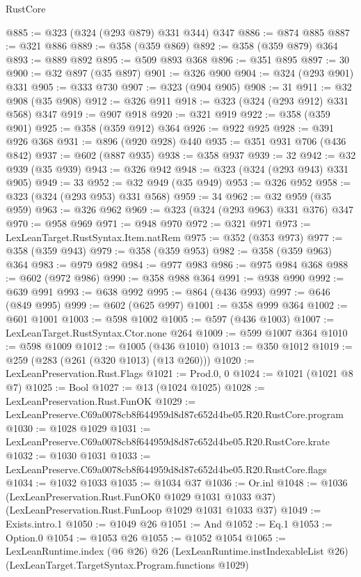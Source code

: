 \begin{lexlean}{RustCore}
\begin{coremodule}
@885 := @323 (@324 (@293 @879) @331 @344) @347
@886 := @874 @885
@887 := @321 @886
@889 := @358 (@359 @869)
@892 := @358 (@359 @879) @364
@893 := @889 @892
@895 := @509 @893 @368
@896 := @351 @895
@897 := 30
@900 := @32 @897 (@35 @897)
@901 := @326 @900
@904 := @324 (@293 @901) @331
@905 := @333 @730
@907 := @323 (@904 @905)
@908 := 31
@911 := @32 @908 (@35 @908)
@912 := @326 @911
@918 := @323 (@324 (@293 @912) @331 @568) @347
@919 := @907 @918
@920 := @321 @919
@922 := @358 (@359 @901)
@925 := @358 (@359 @912) @364
@926 := @922 @925
@928 := @391 @926 @368
@931 := @896 (@920 @928) @440
@935 := @351 @931 @706 (@436 @842)
@937 := @602 (@887 @935)
@938 := @358 @937
@939 := 32
@942 := @32 @939 (@35 @939)
@943 := @326 @942
@948 := @323 (@324 (@293 @943) @331 @905)
@949 := 33
@952 := @32 @949 (@35 @949)
@953 := @326 @952
@958 := @323 (@324 (@293 @953) @331 @568)
@959 := 34
@962 := @32 @959 (@35 @959)
@963 := @326 @962
@969 := @323 (@324 (@293 @963) @331 @376) @347
@970 := @958 @969
@971 := @948 @970
@972 := @321 @971
@973 := LexLeanTarget.RustSyntax.Item.natRem
@975 := @352 (@353 @973)
@977 := @358 (@359 @943)
@979 := @358 (@359 @953)
@982 := @358 (@359 @963) @364
@983 := @979 @982
@984 := @977 @983
@986 := @975 @984 @368
@988 := @602 (@972 @986)
@990 := @358 @988 @364
@991 := @938 @990
@992 := @639 @991
@993 := @638 @992
@995 := @864 (@436 @993)
@997 := @646 (@849 @995)
@999 := @602 (@625 @997)
@1001 := @358 @999 @364
@1002 := @601 @1001
@1003 := @598 @1002
@1005 := @597 (@436 @1003)
@1007 := LexLeanTarget.RustSyntax.Ctor.none @264
@1009 := @599 @1007 @364
@1010 := @598 @1009
@1012 := @1005 (@436 @1010)
@1013 := @350 @1012
@1019 := @259 (@283 (@261 (@320 @1013) (@13 @260)))
@1020 := LexLeanPreservation.Rust.Flags
@1021 := Prod.{0, 0}
@1024 := @1021 (@1021 @8 @7)
@1025 := Bool
@1027 := @13 (@1024 @1025)
@1028 := LexLeanPreservation.Rust.FunOK
@1029 := LexLeanPreserve.C69a0078cb8f644959d8d87c652d4be05.R20.RustCore.program
@1030 := @1028 @1029
@1031 := LexLeanPreserve.C69a0078cb8f644959d8d87c652d4be05.R20.RustCore.krate
@1032 := @1030 @1031
@1033 := LexLeanPreserve.C69a0078cb8f644959d8d87c652d4be05.R20.RustCore.flags
@1034 := @1032 @1033
@1035 := @1034 @37
@1036 := Or.inl
@1048 := @1036
    (LexLeanPreservation.Rust.FunOK0 @1029 @1031 @1033 @37)
    (LexLeanPreservation.Rust.FunLoop @1029 @1031 @1033 @37)
@1049 := Exists.intro.{1}
@1050 := @1049 @26
@1051 := And
@1052 := Eq.{1}
@1053 := Option.{0}
@1054 := @1053 @26
@1055 := @1052 @1054
@1065 := LexLeanRuntime.index
    (@6 @26)
    @26
    (LexLeanRuntime.instIndexableList @26)
    (LexLeanTarget.TargetSyntax.Program.functions @1029)

\end{coremodule}
\end{lexlean}
